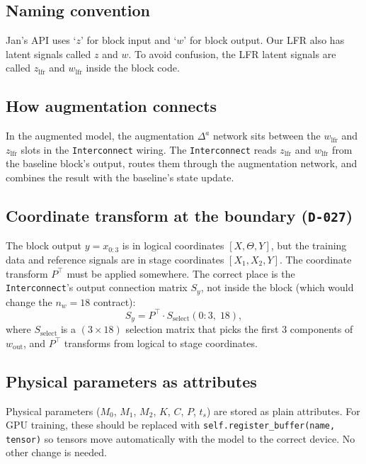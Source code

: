 \documentclass[11pt,a4paper]{article}
\newcommand{\T}{^{\!\top}}
\newcommand{\ts}{t_s}
\newcommand{\decref}[1]{\texttt{D-#1}}
\begin{document}
\subsection{Naming convention}

Jan's API uses `$z$' for block input and `$w$' for block output. Our LFR also has latent
signals called $z$ and $w$. To avoid confusion, the LFR latent signals are called
$z_{\text{lfr}}$ and $w_{\text{lfr}}$ inside the block code.

\subsection{How augmentation connects}

In the augmented model, the augmentation $\Delta^a$ network sits between the $w_{\text{lfr}}$
and $z_{\text{lfr}}$ slots in the \texttt{Interconnect} wiring. The \texttt{Interconnect}
reads $z_{\text{lfr}}$ and $w_{\text{lfr}}$ from the baseline block's output, routes them
through the augmentation network, and combines the result with the baseline's state update.

\subsection{Coordinate transform at the boundary (\decref{027})}

The block output $y = x_{0:3}$ is in logical coordinates $[X, \Theta, Y]$, but the training
data and reference signals are in stage coordinates $[X_1, X_2, Y]$. The coordinate transform
$P\T$ must be applied somewhere. The correct place is the \texttt{Interconnect}'s output
connection matrix $S_y$, not inside the block (which would change the $n_w = 18$ contract):
\begin{equation}
S_y = P\T \cdot S_{\text{select}}(0\!:\!3,\; 18),
\end{equation}
where $S_{\text{select}}$ is a $(3 \times 18)$ selection matrix that picks the first 3
components of $w_{\text{out}}$, and $P\T$ transforms from logical to stage coordinates.

\subsection{Physical parameters as attributes}

Physical parameters ($M_0$, $M_1$, $M_2$, $K$, $C$, $P$, $\ts$) are stored as plain
attributes. For GPU training, these should be replaced with
\texttt{self.register\_buffer(name, tensor)} so tensors move automatically with the model
to the correct device. No other change is needed.
\end{document}
